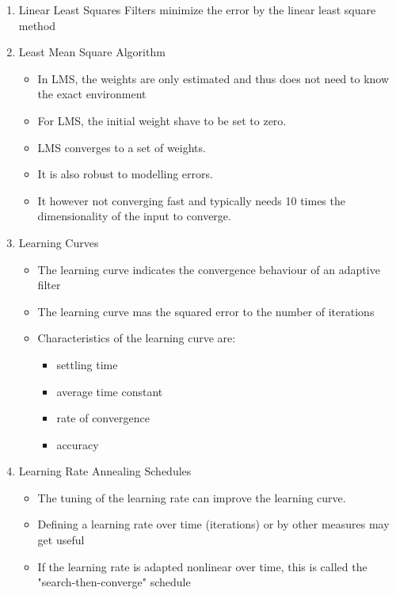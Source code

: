\documentclass{scrartcl}
\begin{document}
\begin{enumerate}
	\item Linear Least Squares Filters minimize the error by the linear least square method

	\item Least Mean Square Algorithm
	\begin{itemize}
		\item In LMS, the weights are only estimated and thus does not need to know the exact environment
		\item For LMS, the initial weight shave to be set to zero.
		\item LMS converges to a set of weights.
		\item It is also robust to modelling errors.
		\item It however not converging fast and typically needs 10 times the dimensionality of the input to converge.
	\end{itemize}

	\item Learning Curves
	\begin{itemize}
		\item The learning curve indicates the convergence behaviour of an adaptive filter
		\item The learning curve mas the squared error to the number of iterations 
		\item Characteristics of the learning curve are:
		\begin{itemize}
			\item settling time
			\item average time constant
			\item rate of convergence
			\item accuracy
		\end{itemize}
	\end{itemize}

	\item Learning Rate Annealing Schedules
	\begin{itemize}
		\item The tuning of the learning rate can improve the learning curve.
		\item Defining a learning rate over time (iterations) or by other measures may get useful
		\item If the learning rate is adapted nonlinear over time, this is called the "search-then-converge" schedule
	\end{itemize}


\end{enumerate}
\end{document}
